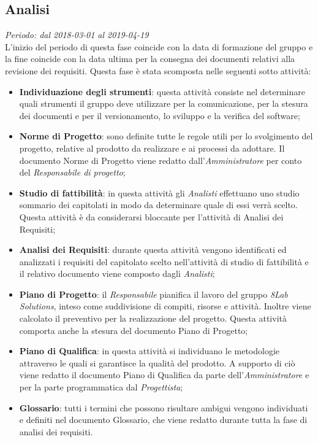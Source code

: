 \subsection{Analisi}
\textit{Periodo: dal 2018-03-01 al 2019-04-19}\\
L'inizio del periodo di questa fase coincide con la data di formazione del 
gruppo e la fine coincide con la data ultima per la consegna dei documenti relativi alla 
revisione dei requisiti. Questa fase è stata scomposta nelle seguenti sotto attività:
\begin{itemize}
	\item \textbf{Individuazione degli strumenti}: questa attività consiste nel 
	determinare quali strumenti il gruppo deve utilizzare per la comunicazione, per 
la stesura dei documenti e per il versionamento, lo sviluppo e la verifica del 
software; 
	\item \textbf{Norme di Progetto}: sono definite tutte le regole utili per lo svolgimento del progetto, relative al prodotto da realizzare e ai processi da adottare. Il documento Norme di Progetto viene redatto dall'\textit{Amministratore} per conto del \textit{Responsabile di progetto};
	\item \textbf{Studio di fattibilità}: in questa attività gli \textit{Analisti} effettuano uno studio sommario dei capitolati in modo da determinare quale di essi verrà scelto. Questa attività è da considerarsi bloccante per l'attività di Analisi dei Requisiti;
	\item \textbf{Analisi dei Requisiti}: durante questa attività vengono 
	identificati ed analizzati i requisiti del capitolato scelto nell'attività 
	di studio di fattibilità e il relativo documento viene composto dagli \textit{Analisti};
	\item \textbf{Piano di Progetto}: il \textit{Responsabile} pianifica il 
	lavoro del gruppo \textit{8Lab Solutions}, inteso come suddivisione di compiti, 
	risorse e attività. Inoltre viene calcolato il preventivo per la realizzazione 
	del progetto. Questa attività comporta anche la stesura 
	del documento Piano di Progetto;
	\item \textbf{Piano di Qualifica}: in questa attività si individuano le 
	metodologie attraverso le quali si garantisce la qualità del prodotto. A supporto di ciò viene redatto il documento Piano di Qualifica da parte dell'\textit{Amministratore} e per la parte programmatica dal \textit{Progettista}; 
	\item \textbf{Glossario}: tutti i termini che possono risultare ambigui vengono individuati e definiti nel documento Glossario, che viene redatto durante tutta la fase di analisi dei requisiti.
\end{itemize}

